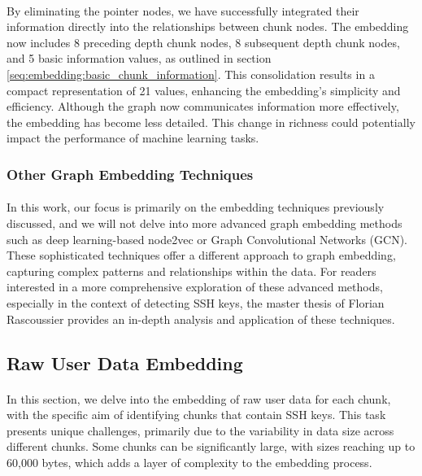         \paragraph{}By eliminating the pointer nodes, we have successfully integrated their information directly into the relationships between chunk nodes. The embedding now includes 8 preceding depth chunk nodes, 8 subsequent depth chunk nodes, and 5 basic information values, as outlined in section \ref{seq:embedding:basic_chunk_information}. This consolidation results in a compact representation of 21 values, enhancing the embedding's simplicity and efficiency. Although the graph now communicates information more effectively, the embedding has become less detailed. This change in richness could potentially impact the performance of machine learning tasks.

    \subsubsection{Other Graph Embedding Techniques}
        \paragraph{}In this work, our focus is primarily on the embedding techniques previously discussed, and we will not delve into more advanced graph embedding methods such as deep learning-based node2vec or Graph Convolutional Networks (GCN). These sophisticated techniques offer a different approach to graph embedding, capturing complex patterns and relationships within the data. For readers interested in a more comprehensive exploration of these advanced methods, especially in the context of detecting SSH keys, the master thesis of Florian Rascoussier provides an in-depth analysis and application of these techniques.

\subsection{Raw User Data Embedding}
    \paragraph{}In this section, we delve into the embedding of raw user data for each chunk, with the specific aim of identifying chunks that contain SSH keys. This task presents unique challenges, primarily due to the variability in data size across different chunks. Some chunks can be significantly large, with sizes reaching up to 60,000 bytes, which adds a layer of complexity to the embedding process.

